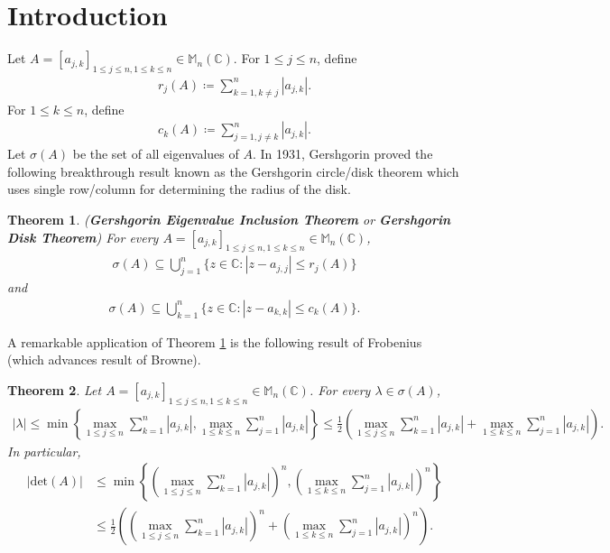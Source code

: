 \documentclass{amsart}
\newtheorem{theorem}{Theorem}[section]
\begin{document}
\section{Introduction}
Let $A=[a_{j,k}]_{1\leq j\leq n, 1\leq k \leq n} \in \mathbb{M}_n(\mathbb{C})$. For $1\leq j \leq n$, define 
\begin{align*}
	r_j(A)\coloneqq\sum_{k=1, k \neq j}^{n}|a_{j,k}|.
\end{align*}
For $1\leq k \leq n$, define 
\begin{align*}
	c_k(A)\coloneqq\sum_{j=1, j \neq k}^{n}|a_{j,k}|.
\end{align*}
Let $\sigma(A)$ be the set of all eigenvalues of $A$. In 1931, Gershgorin proved the following breakthrough result known as the Gershgorin circle/disk theorem which uses single row/column  for determining the radius of the disk.
\begin{theorem} \cite{GERSHGORIN, HORNJOHNSON, VARGA, BRUALDIMELLENDORF} \label{GEIT} (\textbf{Gershgorin Eigenvalue Inclusion Theorem} or \textbf{Gershgorin Disk Theorem})
	For every $A=[a_{j,k}]_{1\leq j\leq n, 1\leq k \leq n}\in  \mathbb{M}_n(\mathbb{C})$,
	\begin{align*}
		\sigma(A)\subseteq \bigcup_{j=1}^n\{z \in \mathbb{C}: |z-a_{j, j}|\leq r_j(A)\}
	\end{align*}
and 
\begin{align*}
		\sigma(A)\subseteq \bigcup_{k=1}^n\{z \in \mathbb{C}: |z-a_{k, k}|\leq c_k(A)\}. 
\end{align*}
\end{theorem}
A remarkable application of Theorem \ref{GEIT} is the following result of Frobenius (which advances result of Browne). 
\begin{theorem} \label{FROBENIUST} \cite{BRAUER0, MARCUSMINC, BROWNE}
Let $A=[a_{j,k}]_{1\leq j\leq n, 1\leq k \leq n} \in \mathbb{M}_n(\mathbb{C})$. For every 	$\lambda \in \sigma(A)$, 
\begin{align*}
	|\lambda| \leq \min \left\{\max_{1\leq j \leq n}\sum_{k=1}^{n}|a_{j,k}|, \max_{1\leq k \leq n}\sum_{j=1}^{n}|a_{j,k}|\right\}\leq \frac{1}{2} \left(\max_{1\leq j \leq n}\sum_{k=1}^{n}|a_{j,k}|+ \max_{1\leq k \leq n}\sum_{j=1}^{n}|a_{j,k}|\right).
\end{align*}
In particular, 
\begin{align*}
	|\text{det}(A)| &\leq \min \left\{\left(\max_{1\leq j \leq n}\sum_{k=1}^{n}|a_{j,k}|\right)^n, \left(\max_{1\leq k \leq n}\sum_{j=1}^{n}|a_{j,k}|\right)^n\right\}\\
	&\leq \frac{1}{2} \left(\left(\max_{1\leq j \leq n}\sum_{k=1}^{n}|a_{j,k}|\right)^n+ \left(\max_{1\leq k \leq n}\sum_{j=1}^{n}|a_{j,k}|\right)^n\right).
\end{align*}
\end{theorem}
\end{document}
